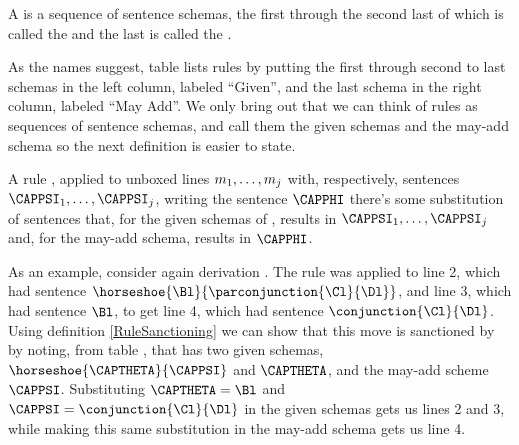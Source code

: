 \begin{majorILnc}{}
	A  is a sequence of sentence schemas, the first through the second last of which is called the  and the last is called the . 
\end{majorILnc}
\noindent{}As the names suggest, table  lists rules by putting the first through second to last schemas in the left column, labeled ``Given'', and the last schema in the right column, labeled ``May Add''. 
We only bring out that we can think of rules as sequences of sentence schemas, and call them the given schemas and the may-add schema so the next definition is easier to state.
\begin{majorILnc}{}
	A rule , applied to unboxed lines $m_1,\ldots,m_{j}$ with, respectively, sentences $\CAPPSI_1,\ldots,\CAPPSI_{\integer{j}}$,  writing the sentence $\CAPPHI$ \Iff there's some substitution of \GSL{} sentences that, for the given schemas of , results in $\CAPPSI_1,\ldots,\CAPPSI_{\integer{j}}$ and, for the may-add schema, results in $\CAPPHI$. 
\end{majorILnc}
\noindent{}As an example, consider again derivation . 
The rule  was applied to line 2, which had sentence $\horseshoe{\Bl}{\parconjunction{\Cl}{\Dl}}$, and line 3, which had sentence $\Bl$, to get line 4, which had sentence $\conjunction{\Cl}{\Dl}$. 
Using definition \ref{RuleSanctioning} we can show that this move is sanctioned by  by noting, from table , that  has two given schemas, $\horseshoe{\CAPTHETA}{\CAPPSI}$ and $\CAPTHETA$, and the may-add scheme $\CAPPSI$. 
Substituting $\CAPTHETA=\Bl$ and $\CAPPSI=\conjunction{\Cl}{\Dl}$ in the given schemas gets us lines 2 and 3, while making this same substitution in the may-add schema gets us line 4. 

